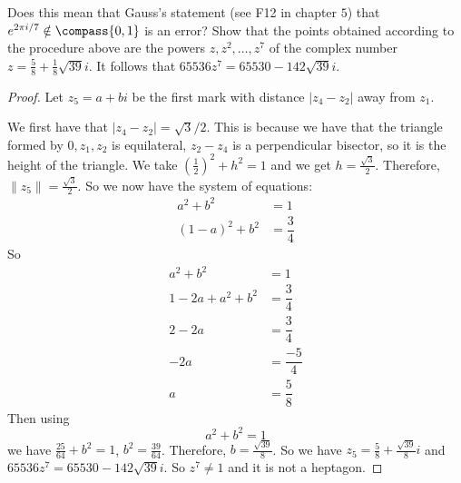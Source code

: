 \documentclass{article}
\begin{document}
Does this mean that Gauss's statement (see F12 in chapter $5$) that $e^{2\pi i/7} \notin \compass\{0, 1\}$ is an error? Show that the points obtained according to the procedure above are the powers $z, z^{2}, \ldots, z^{7}$ of the complex number $z = \frac{5}{8} + \frac{1}{8}\sqrt{39}i$. It follows that $65536z^{7} = 65530 - 142\sqrt{39}i$.
    \begin{proof}
        Let $z_{5} = a + bi$ be the first mark with distance $\lvert z_{4} - z_{2} \rvert$ away from $z_{1}$.
            \begin{fixedfigure}
            \end{fixedfigure}
        We first have that $\lvert z_{4} - z_{2} \rvert = \sqrt{3}/2$. This is because we have that the triangle formed by $0, z_{1}, z_{2}$ is equilateral, $z_{2} - z_{4}$ is a perpendicular bisector, so it is the height of the triangle. We take $(\frac{1}{2})^{2} + h^{2} = 1$ and we get $h = \frac{\sqrt{3}}{2}$. Therefore, $\lVert  z_{5} \rVert = \frac{\sqrt{3}}{2}$. So we now have the system of equations:
            \begin{align*}
                a^{2} + b^{2}       &= 1            \\
                (1 - a)^{2} + b^{2} &= \dfrac{3}{4}   
            \end{align*}
        So 
            \begin{align*}
                a^{2} + b^{2}          &= 1             \\
                1 - 2a + a^{2} + b^{2} &= \dfrac{3}{4}  \\
                2 - 2a                 &= \dfrac{3}{4}  \\
                -2a                    &= \dfrac{-5}{4} \\
                a                      &= \dfrac{5}{8}    
            \end{align*}
        Then using 
            \begin{equation*}
                a^{2} + b^{2} = 1
            \end{equation*}
        we have $\frac{25}{64} + b^{2} = 1$, $b^{2} = \frac{39}{64}$. Therefore, $b = \frac{\sqrt{39}}{8}$. So we have $z_{5} = \frac{5}{8} + \frac{\sqrt{39}}{8}i$ and $65536z^{7} = 65530 - 142\sqrt{39}i$. So $z^{7} \neq 1$ and it is not a heptagon.
    \end{proof}
\end{document}
